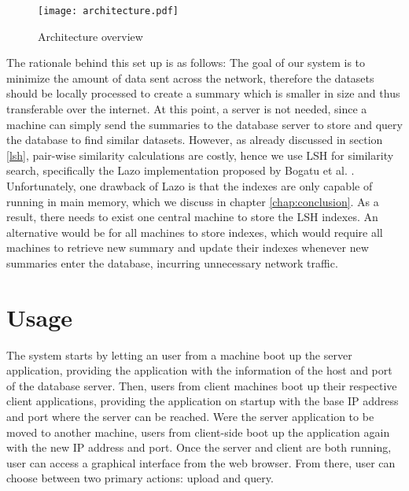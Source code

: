\begin{figure}[h]
    \centering
    \texttt{[image: architecture.pdf]}
    \caption{Architecture overview}
    \label{fig:architecture}
\end{figure}

The rationale behind this set up is as follows: The goal of our system is to minimize the amount of data sent across the network, therefore the datasets should be locally processed to create a summary which is smaller in size and thus transferable over the internet. At this point, a server is not needed, since a machine can simply send the summaries to the database server to store and query the database to find similar datasets. However, as already discussed in section \ref{lsh}, pair-wise similarity calculations are costly, hence we use LSH for similarity search, specifically the Lazo implementation proposed by Bogatu et al. \cite{lazo}. Unfortunately, one drawback of Lazo is that the indexes are only capable of running in main memory, which we discuss in chapter \ref{chap:conclusion}. As a result, there needs to exist one central machine to store the LSH indexes. An alternative would be for all machines to store indexes, which would require all machines to retrieve new summary and update their indexes whenever new summaries enter the database, incurring unnecessary network traffic.

\section{Usage}

The system starts by letting an user from a machine boot up the server application, providing the application with the information of the host and port of the database server. Then, users from client machines boot up their respective client applications, providing the application on startup with the base IP address and port where the server can be reached. Were the server application to be moved to another machine, users from client-side boot up the application again with the new IP address and port. Once the server and client are both running, user can access a graphical interface from the web browser. From there, user can choose between two primary actions: upload and query.


